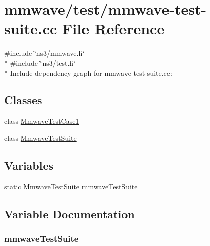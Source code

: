 \hypertarget{mmwave-test-suite_8cc}{}\section{mmwave/test/mmwave-\/test-\/suite.cc File Reference}
\label{mmwave-test-suite_8cc}
{\ttfamily \#include \char`\"{}ns3/mmwave.\+h\char`\"{}}\\*
{\ttfamily \#include \char`\"{}ns3/test.\+h\char`\"{}}\\*
Include dependency graph for mmwave-\/test-\/suite.cc\+:
\subsection*{Classes}
\begin{DoxyCompactItemize}
\item 
class \hyperlink{classMmwaveTestCase1}{Mmwave\+Test\+Case1}
\item 
class \hyperlink{classMmwaveTestSuite}{Mmwave\+Test\+Suite}
\end{DoxyCompactItemize}
\subsection*{Variables}
\begin{DoxyCompactItemize}
\item 
static \hyperlink{classMmwaveTestSuite}{Mmwave\+Test\+Suite} \hyperlink{mmwave-test-suite_8cc_a079870d5e7853e0efa07cd9bbbe05c34}{mmwave\+Test\+Suite}
\end{DoxyCompactItemize}


\subsection{Variable Documentation}
\subsubsection[{\texorpdfstring{mmwave\+Test\+Suite}{mmwaveTestSuite}}]{ mmwave\+Test\+Suite\hspace{0.3cm}{\ttfamily [static]}}\hypertarget{mmwave-test-suite_8cc_a079870d5e7853e0efa07cd9bbbe05c34}{}\label{mmwave-test-suite_8cc_a079870d5e7853e0efa07cd9bbbe05c34}
